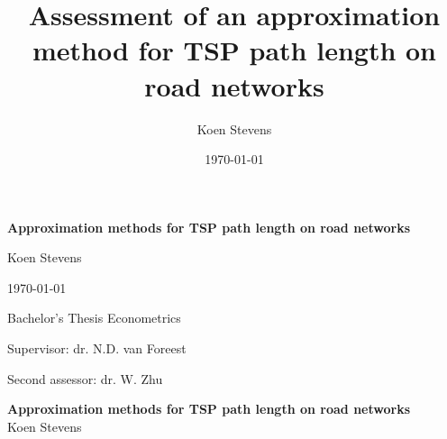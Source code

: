 \pagestyle{empty}
\title{Assessment of an approximation method for TSP path length on road networks}
\author{Koen Stevens}
\date{\today}

\begin{titlepage}
	\centering
	\vspace*{0.3\textheight}
	{\LARGE\bfseries Approximation methods for TSP path length on road networks \par}
	\vspace{2cm}
	{\Large Koen Stevens \par}
	\vfill
	{\large \today \par} %
\end{titlepage}
\clearpage
\thispagestyle{empty}
\vspace*{0.3\textheight}
{\Large Bachelor's Thesis Econometrics \par}
\vspace{1cm}
{\large Supervisor: dr. N.D. van Foreest \par}
\vspace{0.5cm}
{\large Second assessor: dr. W. Zhu \par}
\clearpage
{}
\pagestyle{plain}
\begin{center}
	\LARGE \textbf{Approximation methods for TSP path length on road networks} \\[1.5ex]
	\large Koen Stevens
\end{center}
